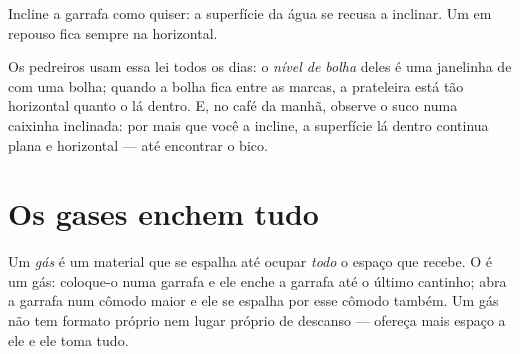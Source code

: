 \begin{omfigure}

{\small Incline a garrafa como quiser: a superfície da água se recusa
a inclinar. Um  em repouso fica sempre na horizontal.}
\end{omfigure}

\begin{example}\label{ex:g3:solids-liquids-gases:level}
Os pedreiros usam essa lei todos os dias: o \emph{nível de bolha}
deles é uma janelinha de  com uma bolha; quando a bolha fica
entre as marcas, a prateleira está tão horizontal quanto o  lá
dentro. E, no café da manhã, observe o suco numa caixinha inclinada:
por mais que você a incline, a superfície lá dentro continua plana e
horizontal --- até encontrar o bico.
\end{example}

\section{Os gases enchem tudo}

\begin{definition}[Gás]\label{def:g3:solids-liquids-gases:gas}
Um \emph{gás} é um material que se espalha até ocupar
\emph{todo} o espaço que recebe. O  é um gás: coloque-o numa
garrafa e ele enche a garrafa até o último cantinho; abra a garrafa
num cômodo maior e ele se espalha por esse cômodo também. Um gás não
tem formato próprio nem lugar próprio de descanso --- ofereça mais
espaço a ele e ele toma tudo.
\end{definition}

